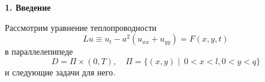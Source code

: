 \makerutitle

%
%
%
%
%
%
%
%
%
%
%
%
%
%
%
%
%
%
%



{\bf 1. Введение}

Рассмотрим уравнение теплопроводности
\begin{equation}\label{a1}
Lu\equiv u_t-a^2(u_{xx}+u_{yy})=F(x,y,t)
\end{equation}
в параллелепипеде
$$D=\Pi\times(0, T), \quad  \Pi=\{(x,y) \mid \ 0<x<l, 0<y<q\}$$
и следующие задачи для него.

